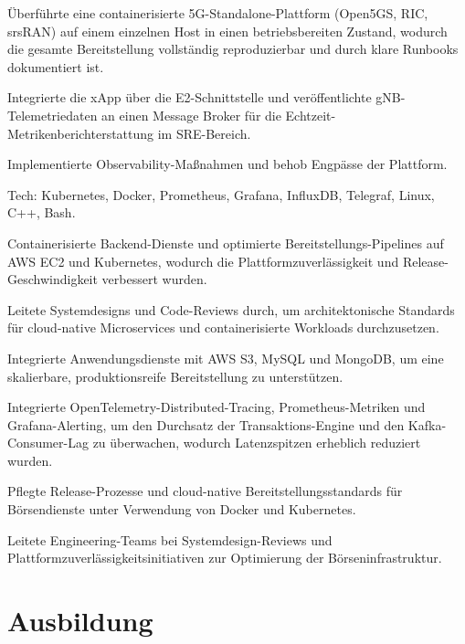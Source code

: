 \documentclass[10pt,a4paper]{resume}
\begin{document}
\bullets
  \item Überführte eine containerisierte 5G-Standalone-Plattform (Open5GS, RIC, srsRAN) auf einem einzelnen Host in einen betriebsbereiten Zustand, wodurch die gesamte Bereitstellung vollständig reproduzierbar und durch klare Runbooks dokumentiert ist.
  \item Integrierte die xApp über die E2-Schnittstelle und veröffentlichte gNB-Telemetriedaten an einen Message Broker für die Echtzeit-Metrikenberichterstattung im SRE-Bereich.
  \item Implementierte Observability-Maßnahmen und behob Engpässe der Plattform.
  \item Tech: Kubernetes, Docker, Prometheus, Grafana, InfluxDB, Telegraf, Linux, C++, Bash.
\bulletsend
\vspace{1.5pt}
\bullets
  \item Containerisierte Backend-Dienste und optimierte Bereitstellungs-Pipelines auf AWS EC2 und Kubernetes, wodurch die Plattformzuverlässigkeit und Release-Geschwindigkeit verbessert wurden.
  \item Leitete Systemdesigns und Code-Reviews durch, um architektonische Standards für cloud-native Microservices und containerisierte Workloads durchzusetzen.
  \item Integrierte Anwendungsdienste mit AWS S3, MySQL und MongoDB, um eine skalierbare, produktionsreife Bereitstellung zu unterstützen.
\bulletsend
\vspace{1.5pt}
\bullets
  \item Integrierte OpenTelemetry-Distributed-Tracing, Prometheus-Metriken und Grafana-Alerting, um den Durchsatz der Transaktions-Engine und den Kafka-Consumer-Lag zu überwachen, wodurch Latenzspitzen erheblich reduziert wurden.
  \item Pflegte Release-Prozesse und cloud-native Bereitstellungsstandards für Börsendienste unter Verwendung von Docker und Kubernetes.
  \item Leitete Engineering-Teams bei Systemdesign-Reviews und Plattformzuverlässigkeitsinitiativen zur Optimierung der Börseninfrastruktur.
\bulletsend
\vspace{1.5pt}

\section{Ausbildung}
\end{document}
